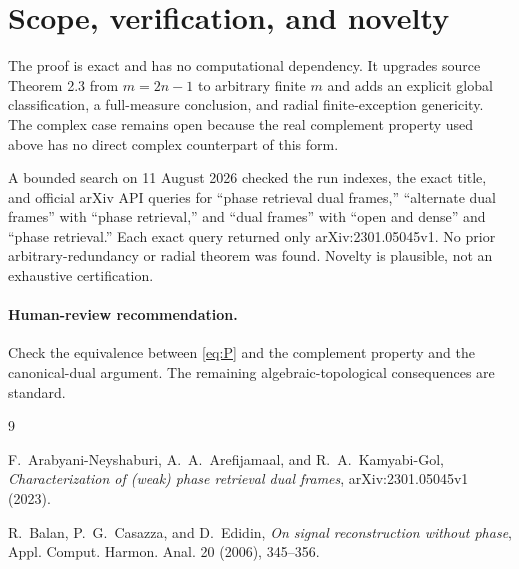 \documentclass[11pt]{article}
\begin{document}
\section{Scope, verification, and novelty}

The proof is exact and has no computational dependency.  It upgrades source
Theorem 2.3 from $m=2n-1$ to arbitrary finite $m$ and adds an explicit global
classification, a full-measure conclusion, and radial finite-exception
genericity.  The complex case remains open because the real complement
property used above has no direct complex counterpart of this form.

A bounded search on 11 August 2026 checked the run indexes, the exact title,
and official arXiv API queries for ``phase retrieval dual frames,''
``alternate dual frames'' with ``phase retrieval,'' and ``dual frames'' with
``open and dense'' and ``phase retrieval.''  Each exact query returned only
arXiv:2301.05045v1.  No prior arbitrary-redundancy or radial theorem was
found.  Novelty is plausible, not an exhaustive certification.

\paragraph{Human-review recommendation.}
Check the equivalence between \eqref{eq:P} and the complement property and the
canonical-dual argument.  The remaining algebraic-topological consequences
are standard.

\begin{thebibliography}{9}

F.~Arabyani-Neyshaburi, A.~A.~Arefijamaal, and R.~A.~Kamyabi-Gol,
\emph{Characterization of (weak) phase retrieval dual frames},
arXiv:2301.05045v1 (2023).

R.~Balan, P.~G.~Casazza, and D.~Edidin,
\emph{On signal reconstruction without phase},
Appl. Comput. Harmon. Anal. 20 (2006), 345--356.

\end{thebibliography}
\end{document}
